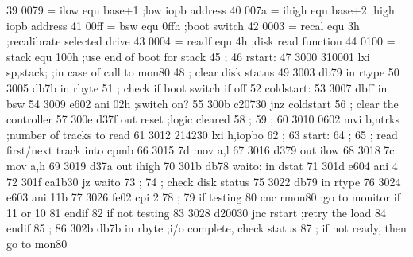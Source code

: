  39      0079 =           ilow     equ     base+1        ;low iopb address
 40      007a =           ihigh    equ     base+2        ;high iopb address
 41      00ff =           bsw      equ     0ffh          ;boot switch
 42      0003 =           recal    equ     3h            ;recalibrate selected drive
 43      0004 =           readf    equ     4h            ;disk read function
 44      0100 =           stack    equ     100h          ;use end of boot for stack
 45                       ;
 46                       rstart:
 47      3000 310001               lxi     sp,stack;     ;in case of call to mon80
 48                       ;        clear disk status
 49      3003 db79                 in      rtype
 50      3005 db7b                 in      rbyte
 51                       ;        check if boot switch if off
 52                       coldstart:
 53      3007 dbff                 in      bsw
 54      3009 e602                 ani     02h           ;switch on?
 55      300b c20730               jnz     coldstart
 56                       ;        clear the controller
 57      300e d37f                 out     reset         ;logic cleared
 58                       ;
 59                       ;
 60      3010 0602                 mvi     b,ntrks       ;number of tracks to read
 61      3012 214230               lxi     h,iopbo
 62                       ;
 63                       start:
 64                       ;
 65                       ;        read first/next track into cpmb
 66      3015 7d                   mov     a,l
 67      3016 d379                 out     ilow
 68      3018 7c                   mov     a,h
 69      3019 d37a                 out     ihigh
 70      301b db78        waito:   in      dstat
 71      301d e604                 ani     4
 72      301f ca1b30               jz      waito
 73                       ;
 74                       ;        check disk status
 75      3022 db79                 in      rtype
 76      3024 e603                 ani     11b
 77      3026 fe02                 cpi     2
 78                       ;
 79                                if      testing
 80                                cnc     rmon80    ;go to monitor if 11 or 10
 81                                endif
 82                                if      not testing
 83      3028 d20030               jnc     rstart    ;retry the load
 84                                endif
 85                       ;
 86      302b db7b                 in      rbyte     ;i/o complete, check status
 87                       ;        if not ready, then go to mon80
